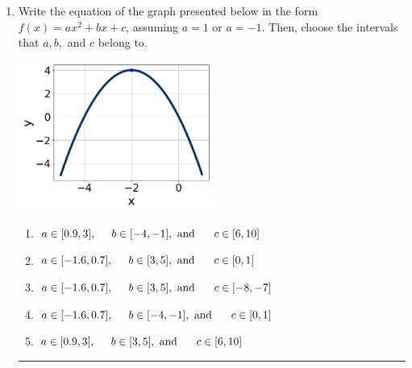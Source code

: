\documentclass[14pt]{extbook}
\newcommand{\litem}[1]{\item#1\hspace*{-1cm}\rule{\textwidth}{0.4pt}}
\begin{document}
\begin{enumerate}
{\begin{enumerate}[label=\Alph*.]
\end{enumerate} }
\litem{
Write the equation of the graph presented below in the form $f(x)=ax^2+bx+c$, assuming  $a=1$ or $a=-1$. Then, choose the intervals that $a, b,$ and $c$ belong to.
\begin{center}
    \includegraphics[width=0.5\textwidth]{../Figures/quadraticGraphToEquationA.png}
\end{center}
\begin{enumerate}[label=\Alph*.]
\item \( a \in [0.9, 3], \hspace*{5mm} b \in [-4, -1], \text{ and } \hspace*{5mm} c \in [6, 10] \)
\item \( a \in [-1.6, 0.7], \hspace*{5mm} b \in [3, 5], \text{ and } \hspace*{5mm} c \in [0, 1] \)
\item \( a \in [-1.6, 0.7], \hspace*{5mm} b \in [3, 5], \text{ and } \hspace*{5mm} c \in [-8, -7] \)
\item \( a \in [-1.6, 0.7], \hspace*{5mm} b \in [-4, -1], \text{ and } \hspace*{5mm} c \in [0, 1] \)
\item \( a \in [0.9, 3], \hspace*{5mm} b \in [3, 5], \text{ and } \hspace*{5mm} c \in [6, 10] \)

\end{enumerate} }
\end{enumerate}
\end{document}
